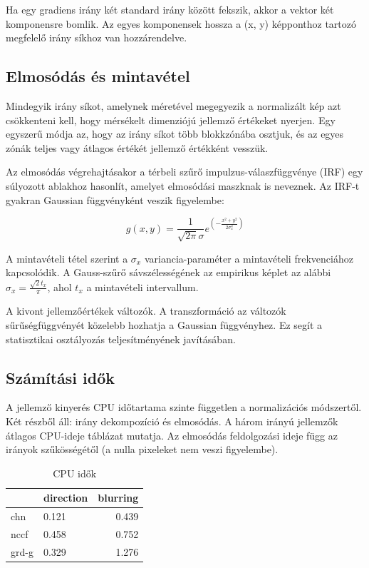 Ha egy gradiens irány két standard irány között fekszik, akkor a vektor két komponensre bomlik. Az egyes komponensek hossza a (x, y) képponthoz tartozó megfelelő irány síkhoz van hozzárendelve.

\subsection{Elmosódás és mintavétel}

Mindegyik irány síkot, amelynek méretével megegyezik a normalizált kép azt csökkenteni kell, hogy mérsékelt dimenziójú jellemző értékeket nyerjen. Egy egyszerű módja az, hogy az irány síkot több blokkzónába osztjuk, és az egyes zónák teljes vagy átlagos értékét jellemző értékként vesszük.

Az elmosódás végrehajtásakor a térbeli szűrő impulzus-válaszfüggvénye (IRF) egy súlyozott ablakhoz hasonlít, amelyet elmosódási maszknak is neveznek. Az IRF-t gyakran Gaussian függvényként veszik figyelembe:

$$
g(x,y) = \frac{1}{\sqrt{2\pi}\sigma} e^{{(- \frac{x^2 + y^2}{2 \sigma_x^2})}}
$$

A mintavételi tétel szerint a $\sigma_x$ variancia-paraméter a mintavételi frekvenciához kapcsolódik. A Gauss-szűrő sávszélességének az empirikus képlet az alábbi $\sigma_x = \frac{\sqrt{2}t_x}{\pi}$, ahol $t_x$ a mintavételi intervallum.

A kivont jellemzőértékek változók. A transzformáció az változók sűrűségfüggvényét közelebb hozhatja a Gaussian függvényhez. Ez segít a statisztikai osztályozás teljesítményének javításában.

\subsection{Számítási idők}
A jellemző kinyerés CPU időtartama szinte független a normalizációs módszertől. Két részből áll: irány dekompozíció és elmosódás. A három irányú jellemzők átlagos CPU-ideje
 táblázat mutatja. Az elmosódás feldolgozási ideje függ az irányok szűkösségétől (a nulla pixeleket nem veszi figyelembe).

\begin{table}[h]
\centering
\caption{CPU idők}
\label{cpu_times}
\begin{tabular}{|l|l|r|}
\hline
\multicolumn{1}{|c|}{} & direction & blurring \\ \hline
chn                    & 0.121     & 0.439    \\ \hline
nccf                   & 0.458     & 0.752    \\ \hline
grd-g                  & 0.329     & 1.276    \\ \hline
\end{tabular}
\end{table}

